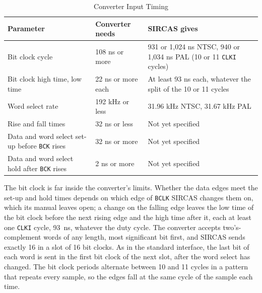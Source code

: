\begin{table}[H]
	\centering
	\small
	\begin{tabular}{p{4.6cm}p{2.9cm}p{4.6cm}}
		\toprule
		\textbf{Parameter}                                    & \textbf{Converter needs} & \textbf{SIRCAS gives}                                                     \\
		\midrule
		Bit clock cycle                                       & 108 ns or more           & 931 or 1,024 ns NTSC, 940 or 1,034 ns PAL (10 or 11 \texttt{CLKI} cycles) \\
		Bit clock high time, low time                         & 22 ns or more each       & At least 93 ns each, whatever the split of the 10 or 11 cycles            \\
		Word select rate                                      & 192 kHz or less          & 31.96 kHz NTSC, 31.67 kHz PAL                                             \\
		Rise and fall times                                   & 32 ns or less            & Not yet specified                                                         \\
		Data and word select set-up before \texttt{BCK} rises & 32 ns or more            & Not yet specified                                                         \\
		Data and word select hold after \texttt{BCK} rises    & 2 ns or more             & Not yet specified                                                         \\
		\bottomrule
	\end{tabular}
	\caption{Converter Input Timing}
	\label{tab:converter-timing}
\end{table}

\noindent The bit clock is far inside the converter's limits. Whether the data edges meet the set-up and hold times depends
on which edge of \texttt{BCLK} SIRCAS changes them on, which its manual leaves open; a change on the falling edge leaves the
low time of the bit clock before the next rising edge and the high time after it, each at least one \texttt{CLKI} cycle, 93~ns,
whatever the duty cycle. The converter accepts two's-complement words of any length, most significant bit first, and SIRCAS
sends exactly 16 in a slot of 16 bit clocks. As in the standard interface, the last bit of each word is sent in the first bit
clock of the next slot, after the word select has changed. The bit clock periods alternate between 10 and 11 cycles in a
pattern that repeats every sample, so the edges fall at the same cycle of the sample each time.

